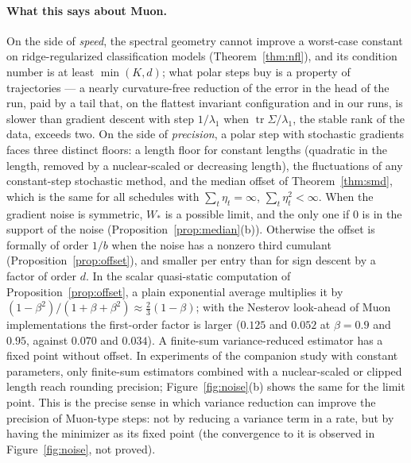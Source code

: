\documentclass[11pt]{article}
\theoremstyle{remark}
\newcommand{\tr}{\operatorname{tr}}
\begin{document}
\paragraph{What this says about Muon.} On the side of \emph{speed}, the spectral geometry cannot improve a worst-case
constant on ridge-regularized classification models (Theorem~\ref{thm:nfl}), and its condition number is at least
$\min(K,d)$; what polar steps buy is a property of trajectories --- a nearly curvature-free reduction of the error in
the head of the run, paid by a tail that, on the flattest invariant configuration and in our runs, is slower than
gradient descent with step $1/\lambda_1$ when $\tr\Sigma/\lambda_1$, the stable rank of the data, exceeds two. On the
side of \emph{precision}, a polar step with stochastic gradients faces three distinct floors: a length floor for
constant lengths (quadratic in the length, removed by a nuclear-scaled or decreasing length), the fluctuations of any
constant-step stochastic method, and the median offset of Theorem~\ref{thm:smd}, which is the same for all schedules
with $\sum_t\eta_t=\infty$, $\sum_t\eta_t^2<\infty$. When the gradient noise is symmetric, $W_\ast$ is a possible limit,
and the only one if $0$ is in the support of the noise (Proposition~\ref{prop:median}(b)). Otherwise the offset is
formally of order $1/b$ when the noise has a nonzero third cumulant (Proposition~\ref{prop:offset}), and smaller per
entry than for sign descent by a factor of order $d$. In the scalar quasi-static computation of
Proposition~\ref{prop:offset}, a plain exponential average multiplies it by
$(1-\beta^2)/(1+\beta+\beta^2)\approx\frac23(1-\beta)$; with the Nesterov look-ahead of Muon implementations the
first-order factor is larger ($0.125$ and $0.052$ at $\beta=0.9$ and $0.95$, against $0.070$ and $0.034$). A finite-sum
variance-reduced estimator has a fixed point without offset. In experiments of the companion study with constant
parameters, only finite-sum estimators combined with a nuclear-scaled or clipped length reach rounding precision;
Figure~\ref{fig:noise}(b) shows the same for the limit point. This is the precise sense in which variance reduction
can improve the precision of Muon-type steps: not by reducing a variance term in a rate, but by having the minimizer
as its fixed point (the convergence to it is observed in Figure~\ref{fig:noise}, not proved).
\end{document}
